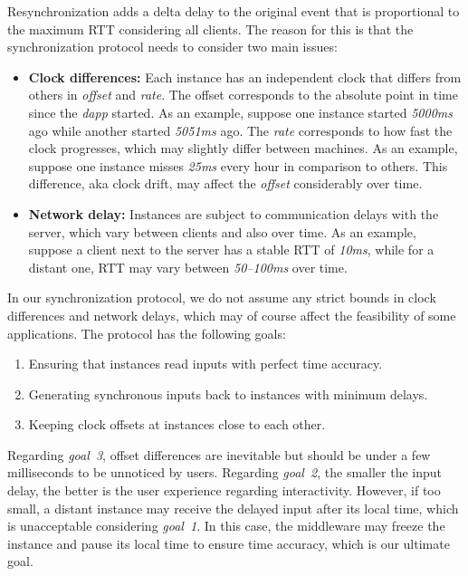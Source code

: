 \documentclass[sigplan,screen]{acmart}
\newcommand{\dapp}{\emph{dapp}\xspace}
\begin{document}
Resynchronization adds a delta delay to the original event that is proportional
to the maximum RTT considering all clients.
The reason for this is that the synchronization protocol needs to consider two
main issues:
%
\begin{itemize}
\item \textbf{Clock differences:}
    Each instance has an independent clock that differs from others in
    \emph{offset} and \emph{rate}.
    The offset corresponds to the absolute point in time since the \dapp started.
    As an example, suppose one instance started \emph{5000ms} ago while another
    started \emph{5051ms} ago.
    The \emph{rate} corresponds to how fast the clock progresses, which may
    slightly differ between machines.
    As an example, suppose one instance misses \emph{25ms} every hour in
    comparison to others.
    This difference, aka clock drift, may affect the \emph{offset} considerably
    over time.
\item \textbf{Network delay:}
    Instances are subject to communication delays with the server, which vary
    between clients and also over time.
    As an example, suppose a client next to the server has a stable RTT of
    \emph{10ms}, while for a distant one, RTT may vary between \emph{50--100ms}
    over time.
\end{itemize}
%
In our synchronization protocol, we do not assume any strict bounds in clock
differences and network delays, which may of course affect the feasibility of
some applications.
%
The protocol has the following goals:
%
\begin{enumerate}
\item Ensuring that instances read inputs with perfect time accuracy.
\item Generating synchronous inputs back to instances with minimum delays.
\item Keeping clock offsets at instances close to each other.
\end{enumerate}
%
Regarding \emph{goal~3}, offset differences are inevitable but should be under
a few milliseconds to be unnoticed by users.
Regarding \emph{goal~2}, the smaller the input delay, the better is the user
experience regarding interactivity.
However, if too small, a distant instance may receive the delayed input after
its local time, which is unacceptable considering \emph{goal~1}.
In this case, the middleware may freeze the instance and pause its local time
to ensure time accuracy, which is our ultimate goal.
\end{document}
